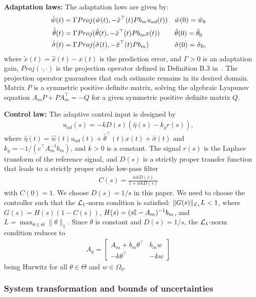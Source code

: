 \documentclass[letterpaper, 10 pt, conference]{ieeeconf}
\begin{document}
\textbf{Adaptation laws:}
The adaptation laws are given by:
\begin{align*}
    \dot{\hat{w}}(t)&=\Gamma Proj(\hat{w}(t),-\tilde{x}^\top(t)Pb_m u_{ad}(t)) &&\hat{w}(0)=\hat{w}_0\nonumber\\
    \dot{\hat{\theta}}(t)&=\Gamma Proj(\hat{\theta}(t),-\tilde{x}^\top(t)Pb_mx(t))&&\hat{\theta}(0)=\hat{\theta}_0\nonumber\\
    \dot{\hat{\sigma}}(t)&=\Gamma Proj(\hat{\sigma}(t),-\tilde{x}^\top(t)Pb_m)&&\hat{\sigma}(0)=\hat{\sigma}_0,
\end{align*}
where $\tilde{x}(t)=\hat{x}(t)-x(t)$ is the prediction error, and $\Gamma>0$ is an adaptation gain, 
$Proj(\cdot,\cdot)$ is the projection operator defined in Definition B.3 in~\cite{hovakimyan2010L1}. The projection operator guarantees that each estimate remains in its desired domain. Matrix $P$ is a symmetric positive definite matrix, solving the algebraic Lyapunov equation
$A_m P + P A_m^\top = -Q$ for a given symmetric positive definite matrix $Q$.

\textbf{Control law:} The adaptive control input is designed by
\begin{align*}
    u_{ad}(s) = -k D(s)(\hat{\eta}(s)-k_gr(s)),
\end{align*}
where $\hat{\eta}(t)=\hat{w}(t)u_{ad}(t)+\hat{\theta}^\top(t)x(t)+\hat{\sigma}(t)$ and $k_g = -1/(c^\top A_m^{-1}b_m)$, and $k>0$ is a constant.
The signal $r(s)$ is the Laplace transform of the reference signal, and $D(s)$ is a strictly proper transfer function that leads to a strictly proper stable low-pass filter
\begin{align*}
    C(s) = \frac{wkD(s)}{1+wkD(s)}
\end{align*}
with $C(0)=1$. We choose $D(s)=1/s$ in this paper.
We need to choose the controller such that
the $\mathcal{L}_1$-norm condition is satisfied: $\|G(s)\|_{\mathcal{L}_1}L<1$, where $G(s)=H(s)(1-C(s))$, $H(s)=(s\mathbb{I}-A_m)^{-1}b_m$, and $L=\max_{\theta \in \Theta}\|\theta\|_1$.
Since $\theta$ is constant and $D(s)=1/s$, the $\mathcal{L}_1$-norm condition reduces to
\begin{align}
    A_g=
    \left[
    \begin{array}{cc}
         A_m+b_m\theta^\top&b_m w  \\
         -k\theta^\top& -kw
    \end{array}
    \right]
    \label{eq:Ag}
\end{align}
being Hurwitz for all $\theta \in \Theta$ and $w \in \Omega_0$.

\subsubsection{System transformation and bounds of uncertainties}\label{sec:bound}
\end{document}
